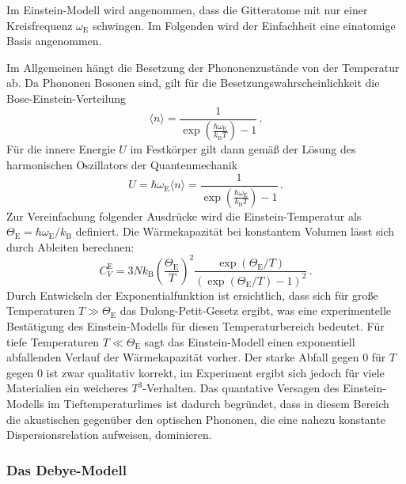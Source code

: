 Im Einstein-Modell wird angenommen, dass die Gitteratome mit nur einer Kreisfrequenz $\omega_\text{E}$ schwingen. Im Folgenden wird der Einfachheit eine einatomige Basis angenommen.

Im Allgemeinen hängt die Besetzung der Phononenzustände von der Temperatur ab. Da Phononen Bosonen sind, gilt für die Besetzungswahrscheinlichkeit die Bose-Einstein-Verteilung
\begin{equation}
  \langle n \rangle = \frac{1}{\exp\left(\frac{\hbar \omega_\text{E}}{k_\text{B} T}\right)-1}\,.
  \label{eqn:boseEinstein}
\end{equation}
Für die innere Energie $U$ im Festkörper gilt dann gemäß der Lösung des harmonischen Oszillators der Quantenmechanik
\begin{equation}
  U = \hbar \omega_\text{E} \langle n \rangle = \frac{1}{\exp\left(\frac{\hbar \omega_\text{E}}{k_\text{B} T}\right)-1}\,.
  \label{eqn:uEinstein}
\end{equation}
Zur Vereinfachung folgender Ausdrücke wird die Einstein-Temperatur als $\Theta_\text{E} = \hbar \omega_\text{E}/k_\text{B}$ definiert.
Die Wärmekapazität bei konstantem Volumen lässt sich durch Ableiten berechnen:
\begin{equation}
  C_V^{\text{E}} = 3 N k_\text{B} \left(\frac{\Theta_\text{E}}{T}\right)^2 \frac{\exp(\Theta_\text{E}/T)}{(\exp(\Theta_\text{E}/T)-1)^2}\,.
  \label{eqn:cVEinstein}
\end{equation}
Durch Entwickeln der Exponentialfunktion ist ersichtlich, dass sich für große Temperaturen $T \gg \Theta_\text{E}$ das Dulong-Petit-Gesetz ergibt, was eine experimentelle Bestätigung des Einstein-Modells für diesen Temperaturbereich bedeutet. Für tiefe Temperaturen $T \ll \Theta_\text{E}$ sagt das Einstein-Modell einen exponentiell abfallenden Verlauf der Wärmekapazität vorher. Der starke Abfall gegen 0 für $T$ gegen 0 ist zwar qualitativ korrekt, im Experiment ergibt sich jedoch für viele Materialien ein weicheres $T^3$-Verhalten. Das quantative Versagen des Einstein-Modells im Tieftemperaturlimes ist dadurch begründet, dass in diesem Bereich die akustischen gegenüber den optischen Phononen, die eine nahezu konstante Dispersionsrelation aufweisen, dominieren.

\subsubsection{Das Debye-Modell}

